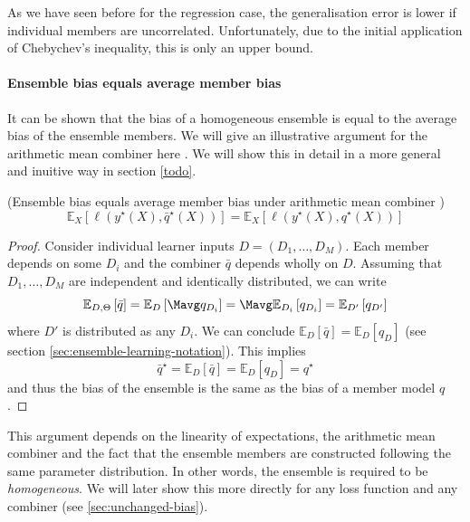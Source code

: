 \documentclass[
    a4paper, %
	fontsize=10pt, %
	twoside=false, %
]{kaobook}
\begin{document}
As we have seen before for the regression case, the generalisation error is lower if individual members are uncorrelated. Unfortunately, due to the initial application of Chebychev's inequality, this is only an upper bound. 

\paragraph{Ensemble bias equals average member bias}
It can be shown that the bias of a homogeneous ensemble is equal to the average bias of the ensemble members. We will give an illustrative argument for the arithmetic mean combiner here
.
We will show this in detail in a more general and inuitive way in section \ref{todo}.

\begin{lemma} (Ensemble bias equals average member bias under arithmetic mean combiner \cite{louppe_UnderstandingRandomForests_2015})
  \label{thm:ensemble-bias-equals-average-bias}
$$
\mathbb{E}_{X}\left[ \ell(y^\star(X), \bar{q}^\star(X)) \right] 
= \mathbb{E}_{X}\left[ \ell(y^\star(X), q^\star(X)) \right] 
$$
\end{lemma}
\begin{proof}
Consider individual learner inputs $D = (D_{1}, \dots, D_{M})$. Each member depends on some $D_{i}$ and the combiner $\bar{q}$ depends wholly on $D$. Assuming that $D_{1}, \dots, D_{M}$ are independent and identically distributed, we can write
$$
\mathbb{E}_{D, \Theta}\left[ \bar{q} \right] = \mathbb{E}_{D}\left[ \Mavg q_{D_{i}} \right] = \Mavg \mathbb{E}_{D_{i}}\left[ q_{D_{i}} \right] = \mathbb{E}_{D'}\left[ q_{D'} \right]
$$
where $D'$ is distributed as any $D_{i}$. We can conclude $\mathbb{E}_{D}\left[ \bar{q} \right] = \mathbb{E}_{D}\left[ q_{D} \right]$ (see section \ref{sec:ensemble-learning-notation}).
This implies
$$
\bar{q}^\star = \mathbb{E}_{D}\left[ \bar{q} \right]  = \mathbb{E}_{D}\left[ q_{D} \right]  = q^\star
$$
and thus the bias of the ensemble is the same as the bias of a member model $q$.
\end{proof}
This argument depends on the linearity of expectations, the arithmetic mean combiner and the fact that the ensemble members are constructed following the same parameter distribution. In other words, the ensemble is required to be \textit{homogeneous}. We will later show this more directly for any loss function and any combiner (see \ref{sec:unchanged-bias}).
\end{document}
